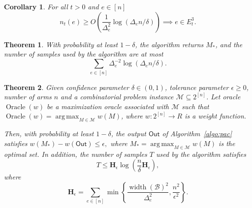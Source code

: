 \documentclass{article}
\newtheorem{corollary}{Corollary}
\newtheorem{theorem}{Theorem}
\newcommand{\M}{\mathcal M}
\newcommand{\B}{\mathcal B}
\DeclareMathOperator{\rank}{width}
\DeclareMathOperator*{\argmax}{arg\,max}
\DeclareMathOperator{\Oracle}{Oracle}
\newcommand{\out}{\mathsf{Out}}
\begin{document}
\begin{spacing}{1.1}
\begin{corollary}
For all $t>0$ and $e\in[n]$
$$ n_t(e) \ge O(\frac{1}{\Delta_e^2}\log(\Delta_e n/\delta)) \implies e\in E_t^3.$$
\end{corollary}

\begin{theorem}
With probability at least $1-\delta$,
the algorithm returns $M_*$,
and the number of samples used by the algorithm are at most
$$
\sum_{e\in [n]} \Delta_e^{-2}\log(\Delta_e n/\delta).
$$
\end{theorem}


\begin{theorem}
Given confidence parameter $\delta \in (0,1)$, tolerance parameter $\epsilon \ge 0$, number of arms $n$ and a combinatorial problem instance $\mathcal M \subseteq 2^{[n]}$.
Let oracle $\Oracle(w)$ be a maximization oracle associated with $\mathcal M$ such that
$\Oracle(w) = \argmax_{M \in \mathcal M} w(M)$, where $w: 2^{[n]} \rightarrow R$ is a weight function.

Then, with probability at least $1-\delta$, the output $\out$ of Algorithm~\ref{algo:pac} satisfies
$
w(M_*)-w(\out) \le \epsilon,
$
where $M_* = \argmax_{M\in \M} w(M)$ is the optimal set.
In addition, the number of samples $T$ used by the algorithm satisfies
$$
T \le \mathbf H_\epsilon \log\left(\frac{n}{\delta}\mathbf H_\epsilon\right),
$$
where
$$
\mathbf H_\epsilon = \sum_{e\in[n]} \min\left\{\frac{\rank(\B)^2}{\Delta_e^2}, \frac{n^2}{\epsilon^2}\right\}.
$$
\end{theorem}


\end{spacing}
\end{document}
